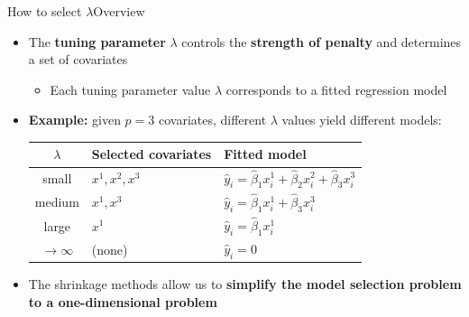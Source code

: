 \documentclass[dvipsnames,hyperref={pdfpagelabels=false}]{beamer}
\begin{document}




















\begin{frame}{How to select $\lambda$}{Overview}
    \begin{itemize}
        \item The \textbf{tuning parameter} $\lambda$ controls the 
        \textbf{strength of penalty} and determines a set of covariates
        \vspace{0.2cm}
        \begin{itemize}
            \item Each tuning parameter value $\lambda$ corresponds to 
            a fitted regression model
            \vspace{0.2cm}
        \end{itemize}
        \item \textbf{Example:} given $p=3$ covariates, different $\lambda$ 
        values yield different models:
        \vspace{0.2cm}
        \begin{center}
        \begin{tabular}{cll}
            \hline
            $\lambda$ & Selected covariates & Fitted model \\
            \hline
            small & $x^1, x^2, x^3$ & $\hat{y}_i = \hat{\beta}_1 x^1_i + \hat{\beta}_2 x^2_i + \hat{\beta}_3 x^3_i$ \\
            medium & $x^1, x^3$ & $\hat{y}_i = \hat{\beta}_1 x^1_i + \hat{\beta}_3 x^3_i$ \\
            large & $x^1$ & $\hat{y}_i = \hat{\beta}_1 x^1_i$ \\
            $\to \infty$ & (none) & $\hat{y}_i = 0$ \\
            \hline
        \end{tabular}
        \end{center}
        \vspace{0.2cm}
        \item The shrinkage methods allow us to \textbf{simplify the model 
        selection problem to a one-dimensional problem}
    \end{itemize}
\end{frame}
\end{document}
